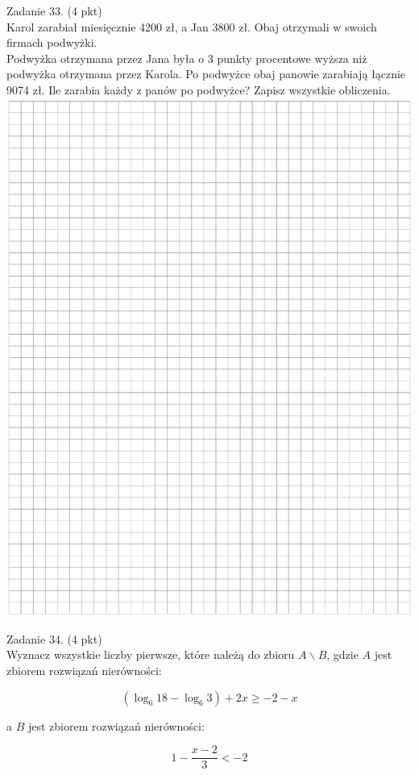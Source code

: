 \documentclass[10pt]{article}
\begin{document}
Zadanie 33. (4 pkt)\\
Karol zarabiał miesięcznie 4200 zł, a Jan 3800 zł. Obaj otrzymali w swoich firmach podwyżki.\\
Podwyżka otrzymana przez Jana była o 3 punkty procentowe wyższa niż podwyżka otrzymana przez Karola. Po podwyżce obaj panowie zarabiają łącznie 9074 zł. Ile zarabia każdy z panów po podwyżce? Zapisz wszystkie obliczenia.\\
\includegraphics[max width=\textwidth, center]{2024_11_21_87037534e5fdc524263ag-12}

Zadanie 34. (4 pkt)\\
Wyznacz wszystkie liczby pierwsze, które należą do zbioru \(A \backslash B\), gdzie \(A\) jest zbiorem rozwiązań nierówności:

\[
\left(\log _{6} 18-\log _{6} 3\right)+2 x \geq-2-x
\]

a \(B\) jest zbiorem rozwiązań nierówności:

\[
1-\frac{x-2}{3}<-2
\]
\end{document}
